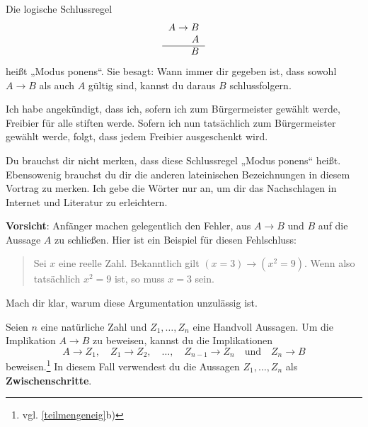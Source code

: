 \begin{axiom} \label{modusponens} 
    Die logische Schlussregel
    \[\begin{tabular}{r}
        $A\to B$ \\
        $A$ \\
        \hline
        $B$
   \end{tabular}\]
    heißt „Modus ponens“. Sie besagt: Wann immer dir gegeben ist, dass sowohl $A\to B$ als auch $A$ gültig sind, kannst du daraus $B$ schlussfolgern.
\end{axiom}


\begin{bsp}
    Ich habe angekündigt, dass ich, sofern ich zum Bürgermeister gewählt werde, Freibier für alle stiften werde. Sofern ich nun tatsächlich zum Bürgermeister gewählt werde, folgt, dass jedem Freibier ausgeschenkt wird.
\end{bsp}


\begin{bem}
    Du brauchst dir nicht merken, dass diese Schlussregel „Modus ponens“ heißt. Ebensowenig brauchst du dir die anderen lateinischen Bezeichnungen in diesem Vortrag zu merken. Ich gebe die Wörter nur an, um dir das Nachschlagen in Internet und Literatur zu erleichtern.
\end{bem}


\begin{bem}
    \textbf{Vorsicht}: Anfänger machen gelegentlich den Fehler, aus $A\to B$ und $B$ auf die Aussage $A$ zu schließen. Hier ist ein Beispiel für diesen Fehlschluss:
    \begin{quote}
        Sei $x$ eine reelle Zahl. Bekanntlich gilt $(x=3)\to (x^2=9)$. Wenn also tatsächlich $x^2=9$ ist, so muss $x=3$ sein.
    \end{quote}
    Mach dir klar, warum diese Argumentation unzulässig ist.
\end{bem}


\begin{satz} \label{implikationtrans}
    Seien $n$ eine natürliche Zahl und $Z_1,\dots , Z_n$ eine Handvoll Aussagen. Um die Implikation $A\to B$ zu beweisen, kannst du die Implikationen
        \[ A\to Z_1,\quad Z_1\to Z_2,\quad \dots ,\quad Z_{n-1}\to Z_n\quad \text{und}\quad Z_n\to B \]
    beweisen.\footnote{vgl. \cref{teilmengeneig}b)} In diesem Fall verwendest du die Aussagen $Z_1,\dots , Z_n$ als \textbf{Zwischenschritte}.
\end{satz}


